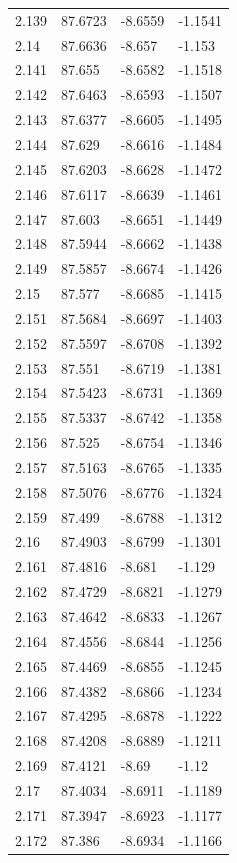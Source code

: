 \begin{tabular}{llll}
2.139 & 87.6723 & -8.6559 & -1.1541 \\
2.14 & 87.6636 & -8.657 & -1.153 \\
2.141 & 87.655 & -8.6582 & -1.1518 \\
2.142 & 87.6463 & -8.6593 & -1.1507 \\
2.143 & 87.6377 & -8.6605 & -1.1495 \\
2.144 & 87.629 & -8.6616 & -1.1484 \\
2.145 & 87.6203 & -8.6628 & -1.1472 \\
2.146 & 87.6117 & -8.6639 & -1.1461 \\
2.147 & 87.603 & -8.6651 & -1.1449 \\
2.148 & 87.5944 & -8.6662 & -1.1438 \\
2.149 & 87.5857 & -8.6674 & -1.1426 \\
2.15 & 87.577 & -8.6685 & -1.1415 \\
2.151 & 87.5684 & -8.6697 & -1.1403 \\
2.152 & 87.5597 & -8.6708 & -1.1392 \\
2.153 & 87.551 & -8.6719 & -1.1381 \\
2.154 & 87.5423 & -8.6731 & -1.1369 \\
2.155 & 87.5337 & -8.6742 & -1.1358 \\
2.156 & 87.525 & -8.6754 & -1.1346 \\
2.157 & 87.5163 & -8.6765 & -1.1335 \\
2.158 & 87.5076 & -8.6776 & -1.1324 \\
2.159 & 87.499 & -8.6788 & -1.1312 \\
2.16 & 87.4903 & -8.6799 & -1.1301 \\
2.161 & 87.4816 & -8.681 & -1.129 \\
2.162 & 87.4729 & -8.6821 & -1.1279 \\
2.163 & 87.4642 & -8.6833 & -1.1267 \\
2.164 & 87.4556 & -8.6844 & -1.1256 \\
2.165 & 87.4469 & -8.6855 & -1.1245 \\
2.166 & 87.4382 & -8.6866 & -1.1234 \\
2.167 & 87.4295 & -8.6878 & -1.1222 \\
2.168 & 87.4208 & -8.6889 & -1.1211 \\
2.169 & 87.4121 & -8.69 & -1.12 \\
2.17 & 87.4034 & -8.6911 & -1.1189 \\
2.171 & 87.3947 & -8.6923 & -1.1177 \\
2.172 & 87.386 & -8.6934 & -1.1166 \\

\end{tabular}
